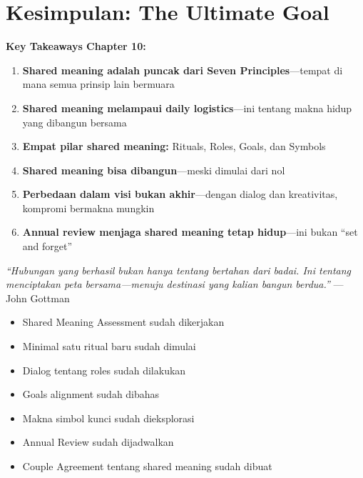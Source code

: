 \section{Kesimpulan: The Ultimate Goal}

\begin{insightbox}
\textbf{Key Takeaways Chapter 10:}

\begin{enumerate}
    \item \textbf{Shared meaning adalah puncak dari Seven Principles}---tempat di mana semua prinsip lain bermuara
    
    \item \textbf{Shared meaning melampaui daily logistics}---ini tentang makna hidup yang dibangun bersama
    
    \item \textbf{Empat pilar shared meaning:} Rituals, Roles, Goals, dan Symbols
    
    \item \textbf{Shared meaning bisa dibangun}---meski dimulai dari nol
    
    \item \textbf{Perbedaan dalam visi bukan akhir}---dengan dialog dan kreativitas, kompromi bermakna mungkin
    
    \item \textbf{Annual review menjaga shared meaning tetap hidup}---ini bukan ``set and forget''
\end{enumerate}

\textit{``Hubungan yang berhasil bukan hanya tentang bertahan dari badai. Ini tentang menciptakan peta bersama---menuju destinasi yang kalian bangun berdua.''} --- John Gottman
\end{insightbox}

\begin{tipbox}
\begin{itemize}
    \item[$\square$] Shared Meaning Assessment sudah dikerjakan
    \item[$\square$] Minimal satu ritual baru sudah dimulai
    \item[$\square$] Dialog tentang roles sudah dilakukan
    \item[$\square$] Goals alignment sudah dibahas
    \item[$\square$] Makna simbol kunci sudah dieksplorasi
    \item[$\square$] Annual Review sudah dijadwalkan
    \item[$\square$] Couple Agreement tentang shared meaning sudah dibuat
\end{itemize}
\end{tipbox}

